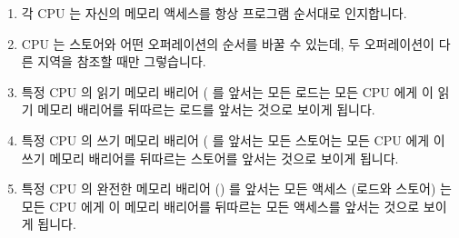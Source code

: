 \fi

\begin{enumerate}
\item	각 CPU 는 자신의 메모리 액세스를 항상 프로그램 순서대로 인지합니다.
\item	CPU 는 스토어와 어떤 오퍼레이션의 순서를 바꿀 수 있는데, 두
	오퍼레이션이 다른 지역을 참조할 때만 그렇습니다.
\item	특정 CPU 의 읽기 메모리 배리어 ( 를 앞서는 모든 로드는
	모든 CPU 에게 이 읽기 메모리 배리어를 뒤따르는 로드를 앞서는 것으로
	보이게 됩니다.
\item	특정 CPU 의 쓰기 메모리 배리어 ( 를 앞서는 모든 스토어는
	모든 CPU 에게 이 쓰기 메모리 배리어를 뒤따르는 스토어를 앞서는 것으로
	보이게 됩니다.
\item	특정 CPU 의 완전한 메모리 배리어 () 를 앞서는 모든 액세스
	(로드와 스토어) 는 모든 CPU 에게 이 메모리 배리어를 뒤따르는 모든
	액세스를 앞서는 것으로 보이게 됩니다.

\iffalse

\item	Each CPU will always perceive its own memory accesses
	as occurring in program order.
\item	CPUs will reorder a given operation with a store only
	if the two operations are referencing different locations.
\item	All of a given CPU's loads preceding a read memory barrier
	(\co{smp_rmb()}) will be perceived by all CPUs to precede
	any loads following that read memory barrier.
\item	All of a given CPU's stores preceding a write memory barrier
	(\co{smp_wmb()}) will be perceived by all CPUs to precede
	any stores following that write memory barrier.
\item	All of a given CPU's accesses (loads and stores) preceding a
	full memory barrier
	(\co{smp_mb()}) will be perceived by all CPUs to precede
	any accesses following that memory barrier.

\fi

\end{enumerate}

